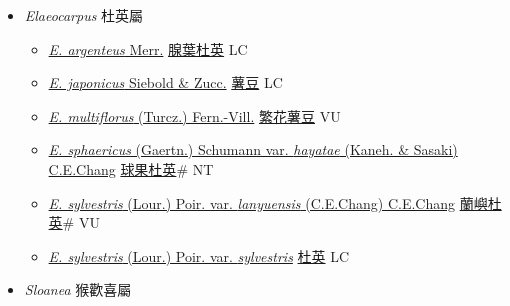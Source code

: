 
  \begin{itemize}
 \item[] \textit{Elaeocarpus} 杜英屬
                    
  \begin{itemize}
        \item[] \href{http://www.theplantlist.org/tpl1.1/search?q=Elaeocarpus+argenteus}{\textit{E. argenteus} Merr.}   \href{\detokenize{http://taibnet.sinica.edu.tw/chi/taibnet_species_list.php?T2=腺葉杜英&T2_new_value=true&fr=y}}{腺葉杜英} LC
        \item[] \href{http://www.theplantlist.org/tpl1.1/search?q=Elaeocarpus+japonicus}{\textit{E. japonicus} Siebold \& Zucc.}   \href{\detokenize{http://taibnet.sinica.edu.tw/chi/taibnet_species_list.php?T2=薯豆&T2_new_value=true&fr=y}}{薯豆} LC
        \item[] \href{http://www.theplantlist.org/tpl1.1/search?q=Elaeocarpus+multiflorus}{\textit{E. multiflorus} (Turcz.) Fern.-Vill.}   \href{\detokenize{http://taibnet.sinica.edu.tw/chi/taibnet_species_list.php?T2=繁花薯豆&T2_new_value=true&fr=y}}{繁花薯豆} VU
        \item[] \href{http://www.theplantlist.org/tpl1.1/search?q=Elaeocarpus+sphaericus+var.+hayatae}{\textit{E. sphaericus} (Gaertn.) Schumann var. \textit{hayatae} (Kaneh. \& Sasaki) C.E.Chang}   \href{\detokenize{http://taibnet.sinica.edu.tw/chi/taibnet_species_list.php?T2=球果杜英&T2_new_value=true&fr=y}}{球果杜英}\# NT
        \item[] \href{http://www.theplantlist.org/tpl1.1/search?q=Elaeocarpus+sylvestris+var.+lanyuensis}{\textit{E. sylvestris} (Lour.) Poir. var. \textit{lanyuensis} (C.E.Chang) C.E.Chang}   \href{\detokenize{http://taibnet.sinica.edu.tw/chi/taibnet_species_list.php?T2=蘭嶼杜英&T2_new_value=true&fr=y}}{蘭嶼杜英}\# VU
        \item[] \href{http://www.theplantlist.org/tpl1.1/search?q=Elaeocarpus+sylvestris+var.+sylvestris}{\textit{E. sylvestris} (Lour.) Poir. var. \textit{sylvestris}}   \href{\detokenize{http://taibnet.sinica.edu.tw/chi/taibnet_species_list.php?T2=杜英&T2_new_value=true&fr=y}}{杜英} LC
  \end{itemize}
 \item[] \textit{Sloanea} 猴歡喜屬
                    

\end{itemize}
